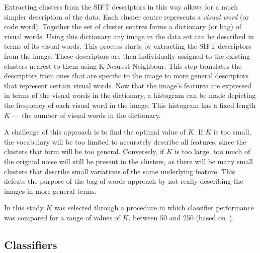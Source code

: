 Extracting clusters from the SIFT descriptors in this way allows for a much simpler description of the data.
Each cluster centre represents a \emph{visual word} (or code word).
Together the set of cluster centres forms a dictionary (or bag) of visual words.
Using this dictionary any image in the data set can be described in terms of its visual words.
This process starts by extracting the SIFT descriptors from the image.
These descriptors are then individually assigned to the existing clusters nearest to them using K-Nearest Neighbour.
This step translates the descriptors from ones that are specific to the image to more general descriptors that represent certain visual words.
Now that the image's features are expressed in terms of the visual words in the dictionary, a histogram can be made depicting the frequency of each visual word in the image.
This histogram has a fixed length $K$ --- the number of visual words in the dictionary.

A challenge of this approach is to find the optimal value of $K$.
If $K$ is too small, the vocabulary will be too limited to accurately describe all features, since the clusters that form will be too general.
Conversely, if $K$ is too large, too much of the original noise will still be present in the clusters, as there will be many small clusters that describe small variations of the same underlying feature. 
This defeats the purpose of the bag-of-words approach by not really describing the images in more general terms.

In this study $K$ was selected through a procedure in which classifier performance was compared for a range of values of $K$, between 50 and 250 (based on~\cite{Nguy2013}).



\subsection{Classifiers}

